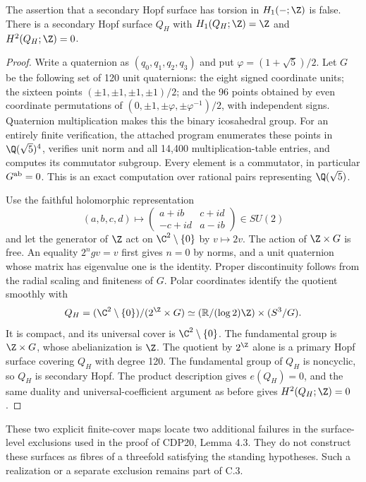 \begin{proposition}
\label{st:C.3.3}
The assertion that a secondary Hopf surface has torsion in
$H_1(-;\Z)$ is false. There is a secondary Hopf surface $Q_H$ with
$H_1(Q_H;\Z)=\Z$ and $H^2(Q_H;\Z)=0$.
\end{proposition}
\begin{proof}
Write a quaternion as $(q_0,q_1,q_2,q_3)$ and put
$\varphi=(1+\sqrt5)/2$. Let $G$ be the following set of 120 unit
quaternions: the eight signed coordinate units; the sixteen points
$(\pm1,\pm1,\pm1,\pm1)/2$; and the 96 points obtained by even
coordinate permutations of
$(0,\pm1,\pm\varphi,\pm\varphi^{-1})/2$, with independent signs.
Quaternion multiplication makes this the binary icosahedral group.
For an entirely finite verification, the attached program enumerates
these points in $\Q(\sqrt5)^4$, verifies unit norm and all 14,400
multiplication-table entries, and computes its commutator subgroup.
Every element is a commutator, in particular $G^{\rm ab}=0$.
This is an exact computation over rational pairs representing
$\Q(\sqrt5)$.

Use the faithful holomorphic representation
\[
(a,b,c,d)\longmapsto
\begin{pmatrix}a+ib&c+id\\-c+id&a-ib\end{pmatrix}\in SU(2)
\]
and let the generator of $\Z$ act on $\C^2\setminus\{0\}$ by
$v\mapsto2v$. The action of $\Z\times G$ is free. An equality
$2^ngv=v$ first gives $n=0$ by norms, and a unit quaternion whose
matrix has eigenvalue one is the identity. Proper discontinuity
follows from the radial scaling and finiteness of $G$.
Polar coordinates identify the quotient smoothly with
\[
Q_H=(\C^2\setminus\{0\})/(2^{\Z}\times G)
\simeq (\mathbb R/(\log2)\Z)\times(S^3/G).
\]
It is compact, and its universal cover is $\C^2\setminus\{0\}$.
The fundamental group is $\Z\times G$, whose abelianization is
$\Z$. The quotient by $2^{\Z}$ alone is a primary Hopf surface
covering $Q_H$ with degree 120. The fundamental group of $Q_H$ is
noncyclic, so $Q_H$ is secondary Hopf. The product description gives
$e(Q_H)=0$, and the same duality and universal-coefficient argument
as before gives $H^2(Q_H;\Z)=0$.
\end{proof}

These two explicit finite-cover maps locate two additional failures
in the surface-level exclusions used in the proof of CDP20,
Lemma 4.3. They do not construct these surfaces as fibres of a
threefold satisfying the standing hypotheses. Such a realization or
a separate exclusion remains part of C.3.

